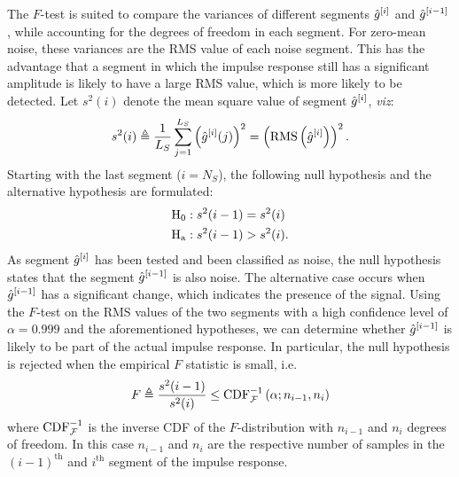 \begin{enumerate}
  The $F$-test is suited to compare the variances of different segments ${\hat{g}}^{[i]}$ and ${\hat{g}}^{[i-1]}$ \citep{Parsons1974}, while accounting for the degrees of freedom in each segment.
  For zero-mean noise, these variances are the \gls{RMS} value of each noise segment.
  This has the advantage that a segment in which the impulse response still has a significant amplitude is likely to have a large \gls{RMS} value, which is more likely to be detected.
  Let $s^2(i)$ denote the mean square value of segment ${\hat{g}}^{[i]}$, \emph{viz}:
  \begin{equation}
    s^2(i) 
    \triangleq \frac{1}{L_S} \sum_{j=1}^{L_S} \left({\hat{g}}^{[i]}(j)\right)^2
    = \left( \operatorname{RMS} \left( \hat{g}^{[i]} \right) \right)^2
           \text{.}
  \end{equation}
  Starting with the last segment ($i = N_S$), the following null hypothesis and the alternative hypothesis are formulated:
  \begin{align}
     \mathrm{H}_{\mathrm{0}} &: s^2(i-1) = s^2(i)\\
     \mathrm{H}_{\mathrm{a}}    &: s^2(i-1) > s^2(i)
     \text{.}
  \end{align}
  As segment ${\hat{g}}^{[i]}$ has been tested and been classified as noise, the null hypothesis states that the segment ${\hat{g}}^{[i-1]}$ is also noise.
  The alternative case occurs when ${\hat{g}}^{[i-1]}$ has a significant change, which indicates the presence of the signal.
  Using the $F$-test on the \gls{RMS} values of the two segments with a high confidence level of $\alpha=0.999$ and the aforementioned hypotheses, we can determine whether ${\hat{g}}^{[i-1]}$ is likely to be part of the actual impulse response.
  In particular, the null hypothesis is rejected when the empirical $F$ statistic is small, i.e.
  \begin{equation}
    F \triangleq \frac{s^2(i-1)}{s^2(i)} \leq \mathrm{CDF}^{-1}_{\operatorname{\mathcal{F}}} \left( \alpha; n_{i-1}, n_{i} \right)
  \end{equation}
  where $ \mathrm{CDF}^{-1}_{\operatorname{\mathcal{F}}}$ is the inverse \gls{CDF} of the \mbox{$F$-distribution} with $n_{i-1}$ and $n_{i}$ degrees of freedom.
  In this case $n_{i-1}$ and $n_{i}$ are the respective number of samples in the $(i-1)^{\text{th}}$ and $i^{\text{th}}$ segment of the impulse response.


\end{enumerate}
